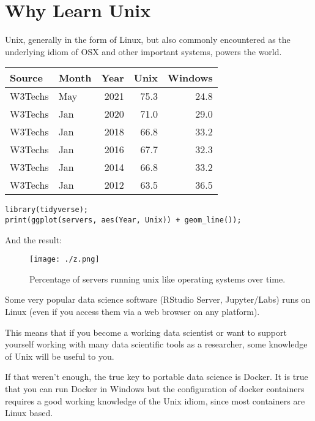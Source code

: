 \documentclass[11pt]{article}
\author{toups}
\date{\today}
\title{}
\begin{document}
\tableofcontents

\section{Why Learn Unix}
\label{sec:org8431c3b}

Unix, generally in the form of Linux, but also commonly encountered as
the underlying idiom of OSX and other important systems, powers the
world.

\begin{table}[htbp]
\label{tab:org6fc85a7}
\centering
\begin{tabular}{llrrr}
Source & Month & Year & Unix & Windows\\
\hline
W3Techs & May & 2021 & 75.3 & 24.8\\
W3Techs & Jan & 2020 & 71.0 & 29.0\\
W3Techs & Jan & 2018 & 66.8 & 33.2\\
W3Techs & Jan & 2016 & 67.7 & 32.3\\
W3Techs & Jan & 2014 & 66.8 & 33.2\\
W3Techs & Jan & 2012 & 63.5 & 36.5\\
\end{tabular}
\end{table}

\begin{verbatim}
library(tidyverse);
print(ggplot(servers, aes(Year, Unix)) + geom_line());
\end{verbatim}

And the result: 

\begin{figure}[htbp]
\centering
\texttt{[image: ./z.png]}
\caption{\label{fig:orgac2913b}Percentage of servers running unix like operating systems over time.}
\end{figure}

Some very popular data science software (RStudio Server, Jupyter/Labs)
runs on Linux (even if you access them via a web browser on any
platform).

This means that if you become a working data scientist or want to
support yourself working with many data scientific tools as a
researcher, some knowledge of Unix will be useful to you.

If that weren't enough, the true key to portable data science is
Docker. It is true that you can run Docker in Windows but the
configuration of docker containers requires a good working knowledge
of the Unix idiom, since most containers are Linux based.
\end{document}
